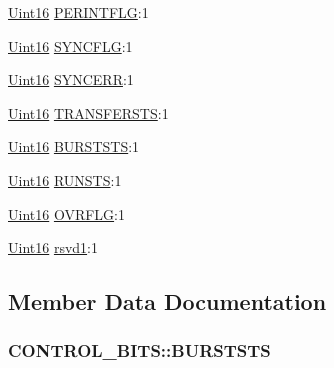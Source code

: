 \begin{DoxyCompactItemize}
\item 
\hyperlink{_d_s_p2833x___device_8h_a59a9f6be4562c327cbfb4f7e8e18f08b}{Uint16} \hyperlink{struct_c_o_n_t_r_o_l___b_i_t_s_a3fa84859b105247bc2777ee5915ca59c}{P\+E\+R\+I\+N\+T\+F\+L\+G}\+:1
\item 
\hyperlink{_d_s_p2833x___device_8h_a59a9f6be4562c327cbfb4f7e8e18f08b}{Uint16} \hyperlink{struct_c_o_n_t_r_o_l___b_i_t_s_a92d47aeb57b40a06b0a9e9e41b5de187}{S\+Y\+N\+C\+F\+L\+G}\+:1
\item 
\hyperlink{_d_s_p2833x___device_8h_a59a9f6be4562c327cbfb4f7e8e18f08b}{Uint16} \hyperlink{struct_c_o_n_t_r_o_l___b_i_t_s_a431e3e190c5177551737af38dbd78e19}{S\+Y\+N\+C\+E\+R\+R}\+:1
\item 
\hyperlink{_d_s_p2833x___device_8h_a59a9f6be4562c327cbfb4f7e8e18f08b}{Uint16} \hyperlink{struct_c_o_n_t_r_o_l___b_i_t_s_a6ae7d9631f3c049dc7f3b748cb536c8c}{T\+R\+A\+N\+S\+F\+E\+R\+S\+T\+S}\+:1
\item 
\hyperlink{_d_s_p2833x___device_8h_a59a9f6be4562c327cbfb4f7e8e18f08b}{Uint16} \hyperlink{struct_c_o_n_t_r_o_l___b_i_t_s_a08336233acb06d68b8df1bf6806674b2}{B\+U\+R\+S\+T\+S\+T\+S}\+:1
\item 
\hyperlink{_d_s_p2833x___device_8h_a59a9f6be4562c327cbfb4f7e8e18f08b}{Uint16} \hyperlink{struct_c_o_n_t_r_o_l___b_i_t_s_a071ccb135e27871a4d36b119a294e72e}{R\+U\+N\+S\+T\+S}\+:1
\item 
\hyperlink{_d_s_p2833x___device_8h_a59a9f6be4562c327cbfb4f7e8e18f08b}{Uint16} \hyperlink{struct_c_o_n_t_r_o_l___b_i_t_s_a0b38edc894c0ae42fd91fdd22963a838}{O\+V\+R\+F\+L\+G}\+:1
\item 
\hyperlink{_d_s_p2833x___device_8h_a59a9f6be4562c327cbfb4f7e8e18f08b}{Uint16} \hyperlink{struct_c_o_n_t_r_o_l___b_i_t_s_ae30c3a11c00edef247751b3c6dff806d}{rsvd1}\+:1
\end{DoxyCompactItemize}


\subsection{Member Data Documentation}
\hypertarget{struct_c_o_n_t_r_o_l___b_i_t_s_a08336233acb06d68b8df1bf6806674b2}{}
\subsubsection[{B\+U\+R\+S\+T\+S\+T\+S}]{ C\+O\+N\+T\+R\+O\+L\+\_\+\+B\+I\+T\+S\+::\+B\+U\+R\+S\+T\+S\+T\+S}\label{struct_c_o_n_t_r_o_l___b_i_t_s_a08336233acb06d68b8df1bf6806674b2}
\hypertarget{struct_c_o_n_t_r_o_l___b_i_t_s_a61bc381fc16d75c3bd8b387caa4de9d7}{}
